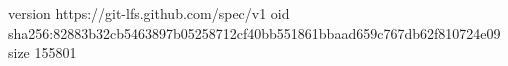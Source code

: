 version https://git-lfs.github.com/spec/v1
oid sha256:82883b32cb5463897b05258712cf40bb551861bbaad659c767db62f810724e09
size 155801
